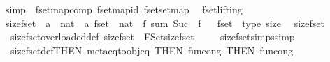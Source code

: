 \begin{isabellebody}
{\isafoldproof}%
%
\isadelimproof
\isanewline
%
\endisadelimproof
\isanewline
{}\isamarkupfalse%
\isanewline
\isanewline
{}\isamarkupfalse%
\ {\isacharbrackleft}simp{\isacharbrackright}\ {\isacharequal}\ fset{\isachardot}map{\isacharunderscore}comp\ fset{\isachardot}map{\isacharunderscore}id\ fset{\isachardot}set{\isacharunderscore}map%
\isadelimdocument
%
\endisadelimdocument
%
\isatagdocument
%
\isamarkuptrue%
%
\endisatagdocument
{\isafolddocument}%
%
\isadelimdocument
%
\endisadelimdocument
{}\isamarkupfalse%
\ \ fset{\isachardot}lifting\ \isanewline
{}\isamarkupfalse%
\ size{\isacharunderscore}fset\ {\isacharcolon}{\isacharcolon}\ {\isachardoublequoteopen}{\isacharparenleft}{\isacharprime}a\ {\isasymRightarrow}\ nat{\isacharparenright}\ {\isasymRightarrow}\ {\isacharprime}a\ fset\ {\isasymRightarrow}\ nat{\isachardoublequoteclose}\ \ {\isachardoublequoteopen}{\isasymlambda}f{\isachardot}\ sum\ {\isacharparenleft}Suc\ {\isasymcirc}\ f{\isacharparenright}{\isachardoublequoteclose}%
\isadelimproof
\ %
\endisadelimproof
%
\isatagproof
\isacommand{{\isachardot}}\isamarkupfalse%
%
\endisatagproof
{\isafoldproof}%
%
\isadelimproof
%
\endisadelimproof
\isanewline
{}\isamarkupfalse%
\isanewline
\isanewline
{}\isamarkupfalse%
\ fset\ {\isacharcolon}{\isacharcolon}\ {\isacharparenleft}type{\isacharparenright}\ size\ \isanewline
{}\isamarkupfalse%
\ size{\isacharunderscore}fset\ \isanewline
\ \ size{\isacharunderscore}fset{\isacharunderscore}overloaded{\isacharunderscore}def{\isacharcolon}\ {\isachardoublequoteopen}size{\isacharunderscore}fset\ {\isacharequal}\ FSet{\isachardot}size{\isacharunderscore}fset\ {\isacharparenleft}{\isasymlambda}{\isacharunderscore}{\isachardot}\ {}{\isacharparenright}{\isachardoublequoteclose}\isanewline
{}\isamarkupfalse%
%
\isadelimproof
\ %
\endisadelimproof
%
\isatagproof
\isacommand{{\isachardot}{\isachardot}}\isamarkupfalse%
%
\endisatagproof
{\isafoldproof}%
%
\isadelimproof
%
\endisadelimproof
\isanewline
{}\isamarkupfalse%
\isanewline
\isanewline
{}\isamarkupfalse%
\ size{\isacharunderscore}fset{\isacharunderscore}simps{\isacharbrackleft}simp{\isacharbrackright}\ {\isacharequal}\isanewline
\ \ size{\isacharunderscore}fset{\isacharunderscore}def{\isacharbrackleft}THEN\ meta{\isacharunderscore}eq{\isacharunderscore}to{\isacharunderscore}obj{\isacharunderscore}eq{\isacharcomma}\ THEN\ fun{\isacharunderscore}cong{\isacharcomma}\ THEN\ fun{\isacharunderscore}cong{\isacharcomma}\isanewline

\end{isabellebody}
